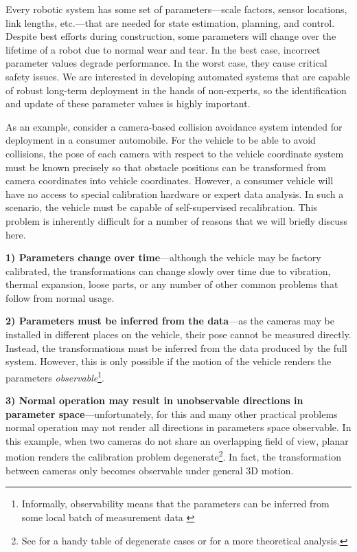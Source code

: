 Every robotic system has some set of parameters---scale factors, sensor locations, link lengths, etc.---that are needed for state estimation, planning, and control. Despite best efforts during construction, some parameters will change over the lifetime of a robot due to normal wear and tear. In the best case, incorrect parameter values degrade performance. In the worst case, they cause critical safety issues.
We are interested in developing automated systems that are capable of robust long-term deployment in the hands of non-experts, so the identification and update of these parameter values is highly important.

As an example, consider a camera-based collision avoidance system intended for deployment in a consumer automobile. For the vehicle to be able to avoid collisions, the pose of each camera with respect to the vehicle coordinate system must be known precisely so that obstacle positions can be transformed from camera coordinates into vehicle coordinates. However, a consumer vehicle will have no access to special calibration hardware or expert data analysis. 
In such a scenario, the vehicle must be capable of self-supervised recalibration. This problem is inherently difficult for a number of reasons that we will briefly discuss here.

 {\bf 1) Parameters change over time}---although the vehicle may be factory calibrated, the transformations can change slowly over time due to vibration, thermal expansion, loose parts, or any number of other common problems that follow from normal usage. 

 {\bf 2) Parameters must be inferred from the data}---as the cameras may be installed in different places on the vehicle, their pose cannot be measured directly. Instead, the transformations must be inferred from the data produced by the full system. However, this is only possible if the motion of the vehicle renders the parameters {\em observable}\footnote{Informally, observability means that the parameters can be inferred from some local batch of measurement data \cite{jazwinski1970stochastic}}. 

 {\bf 3) Normal operation may result in unobservable directions in parameter space}---unfortunately, for this and many other practical problems normal operation may not render all directions in parameters space observable. In this example, when two cameras do not share an overlapping field of view, planar motion renders the calibration problem degenerate\footnote{See \cite{lebraly2010calibration} for a handy table of degenerate cases or \cite{kim2006absolute} for a more theoretical analysis.}. In fact, the transformation between cameras only becomes observable under general 3D motion. 

